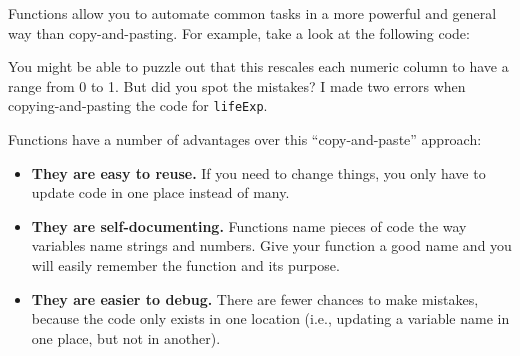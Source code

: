 \documentclass[
]{book}
\newenvironment{Shaded}{\begin{snugshade}}{\end{snugshade}}
\newcommand{\DataTypeTok}[1]{\textcolor[rgb]{0.13,0.29,0.53}{#1}}
\newcommand{\KeywordTok}[1]{\textcolor[rgb]{0.13,0.29,0.53}{\textbf{#1}}}
\newcommand{\NormalTok}[1]{#1}
\newcommand{\OperatorTok}[1]{\textcolor[rgb]{0.81,0.36,0.00}{\textbf{#1}}}
\newcommand{\StringTok}[1]{\textcolor[rgb]{0.31,0.60,0.02}{#1}}
\begin{document}
Functions allow you to automate common tasks in a more powerful and general way than copy-and-pasting. For example, take a look at the following code:

\begin{Shaded}
\end{Shaded}

You might be able to puzzle out that this rescales each numeric column to have a range from 0 to 1. But did you spot the mistakes? I made two errors when copying-and-pasting the code for \texttt{lifeExp}.

Functions have a number of advantages over this ``copy-and-paste'' approach:

\begin{itemize}
\item
  \textbf{They are easy to reuse.} If you need to change things, you only have to update code in one place instead of many.
\item
  \textbf{They are self-documenting.} Functions name pieces of code the way variables name strings and numbers. Give your function a good name and you will easily remember the function and its purpose.
\item
  \textbf{They are easier to debug.} There are fewer chances to make mistakes, because the code only exists in one location (i.e., updating a variable name in one place, but not in another).
\end{itemize}
\end{document}
